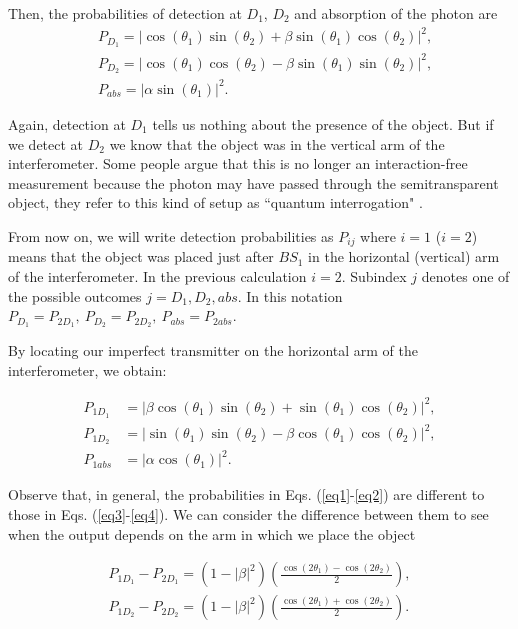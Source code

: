 \documentclass[12pt]{book}
\begin{document}
Then, the probabilities of detection at $D_1$, $D_2$ and absorption of the photon are 
\begin{align}
& P_{D_{1}}=|\cos(\theta_{1})\sin(\theta_{2})+\beta \sin(\theta_{1})\cos(\theta_{2})|^2, \label{eq1}\\
& P_{D_{2}}=|\cos(\theta_{1})\cos(\theta_{2})-\beta \sin(\theta_{1})\sin(\theta_{2})|^2, \\
& P_{abs}=|\alpha \sin(\theta_{1})|^2. \label{eq2}
\end{align}

Again, detection at $D_1$ tells us nothing about the presence of the object. But if we detect at $D_2$ we know that the object was in the vertical arm of the interferometer. Some people argue that this is no longer an interaction-free measurement because the photon may have passed through the semitransparent object, they refer to this kind of setup as ``quantum interrogation" \cite{QI1,QI2}. 


From now on, we will write detection probabilities as $P_{ij}$ where $i=1$ ($i=2$) means that the object was placed just after $BS_1$ in the horizontal (vertical) arm of the interferometer. In the previous calculation $i=2$. Subindex $j$ denotes one of the possible outcomes $j=D_{1},D_{2},abs$. In this notation $P_{D_1}= P_{2D_{1}}, ~P_{D_2}= P_{2D_{2}}, ~P_{abs}= P_{2abs} $. 

By locating our imperfect transmitter on the horizontal arm of the interferometer, we obtain:

\begin{align}
P_{1D_{1}}&=|\beta\cos(\theta_{1})\sin(\theta_{2}) +\sin(\theta_{1})\cos(\theta_{2})|^2,\label{eq3} \\
P_{1D_{2}}&=|\sin(\theta_{1})\sin(\theta_{2})-\beta \cos(\theta_{1})\cos(\theta_{2})|^2,\\
P_{1abs}&=|\alpha \cos(\theta_{1})|^2. \label{eq4}
\end{align}



Observe that, in general, the probabilities in Eqs. (\ref{eq1}-\ref{eq2}) are different to those in Eqs. (\ref{eq3}-\ref{eq4}). We can consider the difference between them to see when the output depends on the arm in which we place the object


\begin{align}
P_{1D_{1}}-P_{2D_{1}}=(1-|\beta|^2)\left(\frac{\cos(2 \theta_{1})-\cos(2 \theta_{2})}{2}\right), \\
P_{1D_{2}}-P_{2D_{2}}=(1-|\beta|^2)\left(\frac{\cos(2 \theta_{1})+\cos(2 \theta_{2})}{2}\right).
\end{align}
\end{document}
